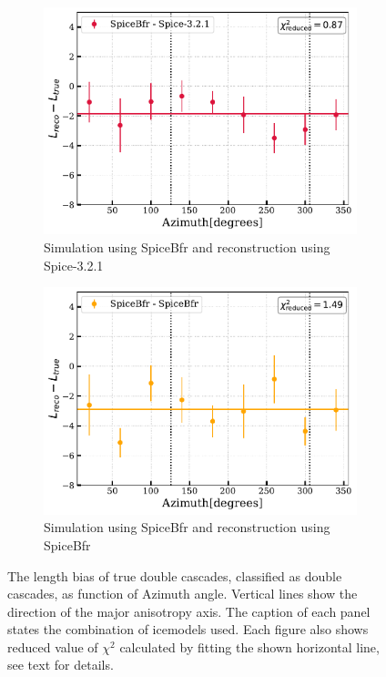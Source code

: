 \begin{figure}[hbt!]
\medskip %
\begin{subfigure}{.7\textwidth}
    \includegraphics[width=\linewidth]{./figures/EventSample/Lbias_bfrspice.pdf}
    \caption{Simulation using SpiceBfr and reconstruction using Spice-3.2.1}
\end{subfigure}\hfill %
\begin{subfigure}{.7\textwidth}
    \includegraphics[width=\linewidth]{./figures/EventSample/Lbias_bfrbfr.pdf}
    \caption{Simulation using SpiceBfr and reconstruction using SpiceBfr}
\end{subfigure}

\caption[The length bias of true double cascades, classified as double cascades, as function of Azimuth angle]{The length bias of true double cascades, classified as double cascades, as function of Azimuth angle. Vertical lines show the direction of the major anisotropy axis. The caption of each panel states the combination of icemodels used. Each figure also shows reduced value of $\chi^2$ calculated by fitting the shown horizontal line, see text for details.}
\end{figure}

